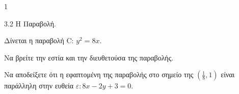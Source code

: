 \begin{ylh}{1}
    \item 3.2 Η Παραβολή.
\end{ylh}
Δίνεται η παραβολή C: $y^2 = 8x$.
\begin{alist}
\item Να βρείτε την εστία και την διευθετούσα της παραβολής. 
\item Να αποδείξετε ότι η εφαπτομένη της παραβολής στο σημείο της $\left(\frac{1}{8},1\right)$ είναι παράλληλη στην ευθεία $\varepsilon: 8x - 2y + 3 = 0$. 
\end{alist}